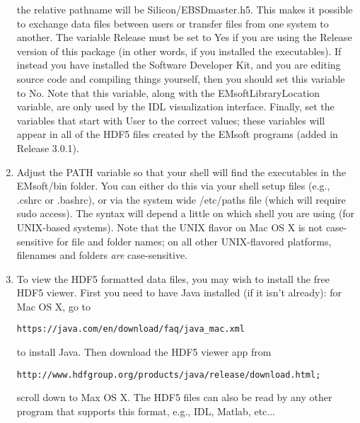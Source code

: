 \documentclass[DIV=calc, paper=letter, fontsize=11pt]{scrartcl}	 %
\begin{document}
\begin{enumerate}
the relative pathname will be \textsf{Silicon/EBSDmaster.h5}.  This makes it possible to exchange data files 
between users or transfer files from one system to another.  The variable \textsf{Release} must be set to \textsf{Yes} if you are 
using the Release version of this package (in other words, if you installed the executables).  If instead you have installed the 
Software Developer Kit, and you are editing source code and compiling things yourself, then you should set this variable to \textsf{No}.  Note that this variable,
along with the \textsf{EMsoftLibraryLocation} variable,  are only used by the IDL visualization interface.  
Finally, set the variables that start with \textsf{User} to the correct values; these 
variables will appear in all of the HDF5 files created by the \textsf{EMsoft} programs (added in Release 3.0.1).

\item Adjust the PATH variable so that your shell will find the executables in the \textsf{EMsoft/bin} folder.  You can either do this via your shell setup files (e.g., \textsf{.cshrc}
or \textsf{.bashrc}), or via the system wide \textsf{/etc/paths} file (which will require \textsf{sudo} access).
The syntax will depend a little on which shell you are using (for UNIX-based systems).  Note that the UNIX flavor on Mac OS X 
is not case-sensitive for file and folder names; on all other UNIX-flavored platforms, filenames and folders \textit{are}
case-sensitive.

\item To view the HDF5 formatted data files, you may wish to install the free HDF5 viewer.  First you need to have Java installed (if it isn't already):
for Mac OS X, go to 
\begin{verbatim}
https://java.com/en/download/faq/java_mac.xml
\end{verbatim}
to install Java.  Then download the HDF5 viewer app from
\begin{verbatim}
http://www.hdfgroup.org/products/java/release/download.html;
\end{verbatim}
scroll down to Max OS X.
The HDF5 files can also be read by any other program that supports this format, e.g., IDL, Matlab, etc...
\end{enumerate}


\newpage
\end{document}
